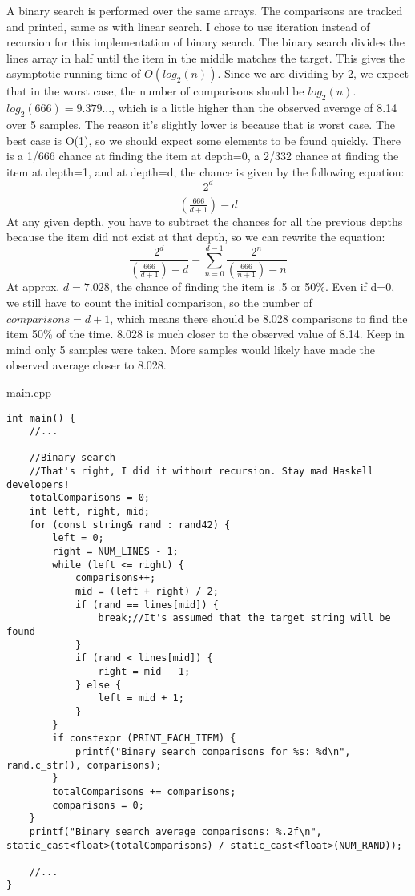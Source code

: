 \documentclass[letterpaper, 10pt,DIV=13]{scrartcl}
\numberwithin{equation}{section} %
\numberwithin{figure}{section} %
\numberwithin{table}{section} %
\begin{document}
A binary search is performed over the same arrays. The comparisons are tracked and printed, same as with
linear search. I chose to use iteration instead of recursion for this implementation of binary search.
The binary search divides the lines array in half until the item in the middle matches the target. This gives the
asymptotic running time of $O(log_2(n))$. Since we are dividing by 2, we expect that in the worst case, the
number of comparisons should be $log_2(n)$. $log_2(666)=9.379...$, which is a little higher than the
observed average of 8.14 over 5 samples. The reason it's slightly lower is because that is worst case. The
best case is O(1), so we should expect some elements to be found quickly. There is a 1/666 chance at finding
the item at depth=0, a 2/332 chance at finding the item at depth=1, and at depth=d, the chance is given by
the following equation:
\begin{equation}
\frac{2^d}{\left(\frac{666}{d+1}\right) - d}
\end{equation}
At any given depth, you have to subtract the chances for all the previous depths because the item did not exist
at that depth, so we can rewrite the equation:
\begin{equation}
\frac{2^d}{\left(\frac{666}{d+1}\right) - d} - \sum_{n=0}^{d-1} \frac{2^n}{\left(\frac{666}{n+1}\right) - n}
\end{equation}
At approx. $d=7.028$, the chance of finding the item is .5 or 50\%. Even if d=0, we still have to count the initial
comparison, so the number of $comparisons=d+1$, which means there should be 8.028 comparisons to find the item
50\% of the time. 8.028 is much closer to the observed value of 8.14. Keep in mind only 5 samples were taken.
More samples would likely have made the observed average closer to 8.028.

main.cpp
\begin{verbatim}
int main() {
    //...

    //Binary search
    //That's right, I did it without recursion. Stay mad Haskell developers!
    totalComparisons = 0;
    int left, right, mid;
    for (const string& rand : rand42) {
        left = 0;
        right = NUM_LINES - 1;
        while (left <= right) {
            comparisons++;
            mid = (left + right) / 2;
            if (rand == lines[mid]) {
                break;//It's assumed that the target string will be found
            }
            if (rand < lines[mid]) {
                right = mid - 1;
            } else {
                left = mid + 1;
            }
        }
        if constexpr (PRINT_EACH_ITEM) {
            printf("Binary search comparisons for %s: %d\n", rand.c_str(), comparisons);
        }
        totalComparisons += comparisons;
        comparisons = 0;
    }
    printf("Binary search average comparisons: %.2f\n", static_cast<float>(totalComparisons) / static_cast<float>(NUM_RAND));

    //...
}
\end{verbatim}
\end{document}
